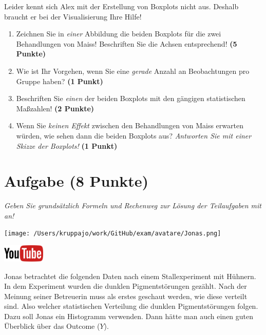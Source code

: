 \documentclass[a4paper, 9pt]{scrartcl}\usepackage[]{graphicx}\usepackage[]{xcolor}
\begin{document}
Leider kennt sich Alex mit der Erstellung von Boxplots nicht aus. Deshalb braucht er bei der Visualisierung Ihre Hilfe!

\begin{enumerate}
\item Zeichnen Sie in \textit{einer} Abbildung die beiden Boxplots für die zwei Behandlungen von Maiss! Beschriften Sie die Achsen entsprechend! \textbf{(5 Punkte)} 
\item Wie ist Ihr Vorgehen, wenn Sie eine \textit{gerade} Anzahl an
  Beobachtungen pro Gruppe haben? \textbf{(1 Punkt)}
\item Beschriften Sie \textit{einen} der beiden Boxplots mit den gängigen
  statistischen Maßzahlen! \textbf{(2 Punkte)}
\item Wenn Sie \textit{keinen Effekt} zwischen den Behandlungen von
  Maiss erwarten würden, wie sehen dann die beiden Boxplots aus?
  \textit{Antworten Sie mit einer Skizze der Boxplots!}
  \textbf{(1 Punkt)}
\end{enumerate} 
\clearpage

\section{Aufgabe \hfill (8 Punkte)}

\textit{Geben Sie grundsätzlich Formeln und Rechenweg zur Lösung der Teilaufgaben mit an!} \\[1Ex]
 

 
\begin{minipage}[t]{0.5\textwidth}
\texttt{[image: /Users/kruppajo/work/GitHub/exam/avatare/Jonas.png]}
\end{minipage}
\begin{minipage}[t]{0.5\textwidth}
\hfill
\href{https://youtu.be/aXvxGC4YLqk}{\includegraphics[width = 2cm]{img/youtube}}\\[1Ex]
\end{minipage}
\vspace{1ex}



Jonas betrachtet die folgenden Daten nach einem Stallexperiment mit Hühnern. In dem Experiment wurden die dunklen Pigmentstörungen gezählt. Nach der Meinung seiner Betreuerin muss als erstes geschaut werden, wie diese verteilt sind. Also welcher statistischen Verteilung die dunklen Pigmentstörungen folgen. Dazu soll Jonas ein Histogramm verwenden. Dann hätte man auch einen guten Überblick über das Outcome ($Y$).
\end{document}

